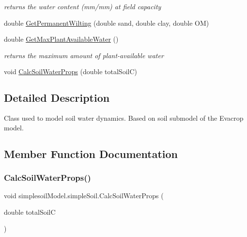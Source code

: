\begin{DoxyCompactItemize}
\begin{DoxyCompactList}\small\item\em returns the water content (mm/mm) at field capacity \end{DoxyCompactList}\item 
double \mbox{\hyperlink{classsimplesoil_model_1_1simple_soil_aa2d3de5234f4eabc596b74af6ec7b4d2}{Get\+Permanent\+Wilting}} (double sand, double clay, double OM)
\item 
double \mbox{\hyperlink{classsimplesoil_model_1_1simple_soil_a1b662cb49ffb1fed83a337ce86dbebc6}{Get\+Max\+Plant\+Available\+Water}} ()
\begin{DoxyCompactList}\small\item\em returns the maximum amount of plant-\/available water \end{DoxyCompactList}\item 
void \mbox{\hyperlink{classsimplesoil_model_1_1simple_soil_ac52b9f1e6b4007ff4b24c8a45816ce74}{Calc\+Soil\+Water\+Props}} (double total\+SoilC)
\end{DoxyCompactItemize}


\subsection{Detailed Description}
Class used to model soil water dynamics. Based on soil submodel of the Evacrop model. 

\subsection{Member Function Documentation}
\mbox{\label{classsimplesoil_model_1_1simple_soil_ac52b9f1e6b4007ff4b24c8a45816ce74}} 
\subsubsection{\texorpdfstring{CalcSoilWaterProps()}{CalcSoilWaterProps()}}
{\footnotesize\ttfamily void simplesoil\+Model.\+simple\+Soil.\+Calc\+Soil\+Water\+Props (\begin{DoxyParamCaption}\item[{double}]{total\+SoilC }\end{DoxyParamCaption})\hspace{0.3cm}{\ttfamily [inline]}}


